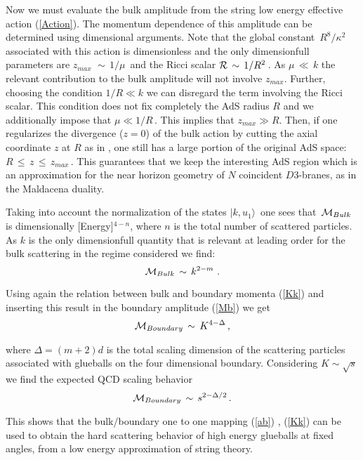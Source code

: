 \documentclass[a4paper,twocolumn,prd,groupedaddress,nofootinbib]{revtex4}
\begin{document}
Now we must evaluate the bulk amplitude from the string low energy 
effective action (\ref{Action}). 
The momentum dependence of this amplitude can be determined using dimensional arguments.
Note that the global constant 
$\, R^8 / \kappa^2\, $ associated with this action is dimensionless
and the only dimensionfull parameters are $z_{max}\,\,\sim\,1/\mu\,$ and the 
Ricci scalar $ {\cal R} \,\sim \, 1/R^2\,$. 
As $\mu\,\ll\,k$ the relevant contribution to the bulk amplitude will not involve
$z_{max}$.  Further, choosing the condition  $ 1/R \ll k $
we can disregard the term involving the Ricci scalar.
This condition does not fix completely the AdS radius $R$ and we additionally 
impose that $\mu \ll 1/R\,$. This implies that $z_{max} \gg R$.
Then, if one regularizes the divergence ($z = 0$) of the bulk action by cutting the axial
coordinate
$z$ at  $R$ as in \cite{GKP}, one still has a large portion of
the original AdS space: $ R \,\le \,z \,\le \,z_{max}\,$.
This guarantees that we keep the interesting AdS region which is 
an approximation for the near horizon geometry of $N$ coincident $D3$-branes,
as in the Maldacena duality.

Taking into account the normalization of the states $\vert k, u_1\rangle\,$
one sees that $\,{\cal M}_{Bulk}\,$ is dimensionally [Energy]$^{4 - n}$,  where $n$ 
is the total number of scattered particles. As $k$ is the only dimensionfull
quantity that is relevant at leading order for the bulk scattering in the 
regime considered we find:
\begin{equation}
{\cal M}_{Bulk}\,\sim\, k^{ 2 - m }\,\,.
\end{equation}

\noindent Using again the relation between bulk and boundary 
momenta (\ref{Kk}) and inserting this result in the boundary amplitude (\ref{Mb})
we get
\begin{equation}
{\cal M}_{Boundary} \,\sim \,K^{4 - \Delta } \,,
\end{equation}

\noindent where $\Delta = ( m + 2) d $ is the total scaling dimension
of the scattering particles associated with glueballs on the four 
dimensional boundary. Considering  $ K \sim \sqrt{ s} $ we find 
the expected QCD scaling behavior\cite{QCD1,BRO}
\begin{equation}
 {\cal M}_{Boundary} \,\sim \,s^{2  - \Delta/2 } 
\,.
\end{equation}

\noindent This shows that the bulk/boundary one to one mapping (\ref{ab}) , (\ref{Kk})
can be used to obtain the hard scattering behavior of high energy glueballs 
at fixed angles, from a low energy approximation of string theory. 
\end{document}
